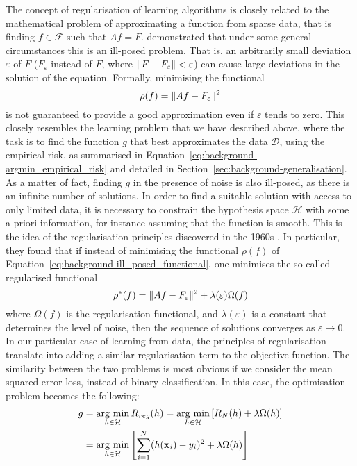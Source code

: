 {The concept of regularisation of learning algorithms is closely related to the mathematical problem of approximating a function from sparse data, that is finding $f \in \mathcal{F}$ such that $Af = F$. \citet{hadamard1902illposed} demonstrated that under some general circumstances this is an ill-posed problem. That is, an arbitrarily small deviation $\varepsilon$ of $F$ ($F_{\varepsilon}$ instead of $F$, where $\lVert F - F_{\varepsilon}\rVert < \varepsilon$) can cause large deviations in the solution of the equation. Formally, minimising the functional
%
\begin{equation}
\label{eq:background-ill_posed_functional}
    \rho(f) = \lVert Af - F_{\varepsilon}\rVert^2
\end{equation}
%
is not guaranteed to provide a good approximation even if $\varepsilon$ tends to zero. This closely resembles the learning problem that we have described above, where the task is to find the function $g$ that best approximates the data $\mathcal{D}$, using the empirical risk, as summarised in Equation~\ref{eq:background-argmin_empirical_risk} and detailed in Section~\ref{sec:background-generalisation}. As a matter of fact, finding $g$ in the presence of noise is also ill-posed, as there is an infinite number of solutions. In order to find a suitable solution with access to only limited data, it is necessary to constrain the hypothesis space $\mathcal{H}$ with some a priori information, for instance assuming that the function is smooth. This is the idea of the regularisation principles discovered in the 1960s \citep{phillips1962regularisation, tikhonov1963regularisation, ivanov1976regularisation}. In particular, they found that if instead of minimising the functional $\rho(f)$ of Equation~\ref{eq:background-ill_posed_functional}, one minimises the so-called regularised functional
%
\begin{equation}
\label{eq:background-reg_functional}
    \rho^*(f) = \lVert Af - F_{\varepsilon}\rVert^2 + \lambda(\varepsilon)\Omega(f)
\end{equation}
%
where $\Omega(f)$ is the regularisation functional, and $\lambda(\varepsilon)$ is a constant that determines the level of noise, then the sequence of solutions converges as $\varepsilon \rightarrow 0$. In our particular case of learning from data, the principles of regularisation translate into adding a similar regularisation term to the objective function. The similarity between the two problems is most obvious if we consider the mean squared error loss, instead of binary classification. In this case, the optimisation problem becomes the following:
%
\begin{equation}
\label{eq:background-reg_objective}
\begin{split}
	g &= \argmin_{h \in \mathcal{H}}R_{reg}(h) = \argmin_{h \in \mathcal{H}}\left[ R_{N}(h) + \lambda\Omega(h) \right]\\
      &= \argmin_{h \in \mathcal{H}}\left[ \sum_{i=1}^{N}(h(\mathbf{x}_{i}) - y_{i})^2 + \lambda\Omega(h) \right]
\end{split}
\end{equation}

}
